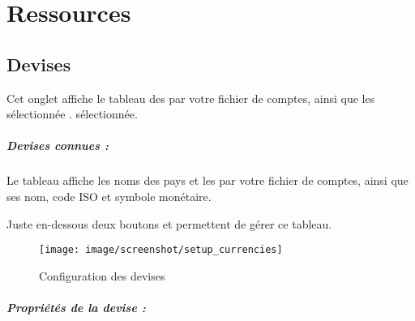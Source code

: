 \section{Ressources\label{setup-resources}}


\subsection{Devises\label{setup-resources-currencies}}

Cet onglet affiche le tableau des  par votre fichier de comptes, ainsi que les  \ifIllustration sélectionnée . 
\else sélectionnée.
\fi

\subparagraph{Devises connues :\label{setup-resources-currencies-known}}

Le tableau affiche les noms des pays et les  par votre fichier de comptes, ainsi que ses nom, code ISO et symbole monétaire.


Juste en-dessous deux boutons  et  permettent de gérer ce tableau.



\ifIllustration
\begin{figure}[ht]
\begin{center}
\texttt{[image: image/screenshot/setup\_currencies]}
\end{center}
\caption{Configuration des devises}
\label{setup-currencies-img}
\end{figure}
\fi




\subparagraph{Propriétés de la devise :\label{setup-resources-currencies-properties}}

